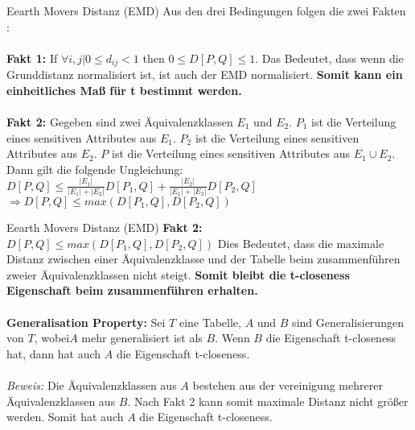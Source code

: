 \begin{frame}{Eearth Movers Distanz (EMD)}
	Aus den drei Bedingungen folgen die zwei Fakten \cite{Li2007t-closseness}:\\
	\ \\
	\textbf{Fakt 1:} If $\forall i,j | 0 \le d_{ij} < 1$ then $0 \le D[P,Q]  \le 1$. 
	Das Bedeutet, dass wenn die Grunddistanz normalisiert ist, ist auch der EMD normalisiert. \textbf{Somit kann ein einheitliches Maß für t bestimmt werden.}\\
	\ \\
	\textbf{Fakt 2:} Gegeben sind zwei Äquivalenzklassen $E_1$ und $E_2$.
	$P_1$ ist die Verteilung eines sensitiven Attributes aus $E_1$.
	$P_2$ ist die Verteilung eines sensitiven Attributes aus $E_2$.
	$P$ ist die Verteilung eines sensitiven Attributes aus $E_1 \cup E_2$. Dann gilt die folgende Ungleichung: \\
	$D[P,Q] \le \frac{|E_1|}{|E_1|+|E_2|}D[P_1,Q] + \frac{|E_2|}{|E_1|+|E_2|}D[P_2,Q]$\\
	$\Rightarrow D[P,Q] \le max(D[P_1,Q], D[P_2,Q])$ 
\end{frame}

\begin{frame}{Eearth Movers Distanz (EMD)}
	\textbf{Fakt 2:} $D[P,Q] \le max(D[P_1,Q], D[P_2,Q])$ 
	Dies Bedeutet, dass die maximale Distanz zwischen einer Äquivalenzklasse und der Tabelle beim zusammenführen zweier Äquivalenzklassen nicht steigt. \textbf{Somit bleibt die t-closeness Eigenschaft beim zusammenführen erhalten.} \\ 
	\ \\
	\textbf{Generalisation Property:} Sei $T$ eine Tabelle, $A$ und $B$ sind Generalisierungen von $T$, wobei$A$ mehr generalisiert ist als $B$. Wenn $B$ die Eigenschaft t-closeness hat, dann hat auch $A$ die Eigenschaft t-closeness.\\
	\ \\
	\textit{Beweis:} Die Äquivalenzklassen aus $A$ bestehen aus der vereinigung mehrerer Äquivalenzklassen aus $B$. Nach Fakt 2 kann somit maximale Distanz nicht größer werden. Somit hat auch $A$ die Eigenschaft t-closeness.  
\end{frame}

